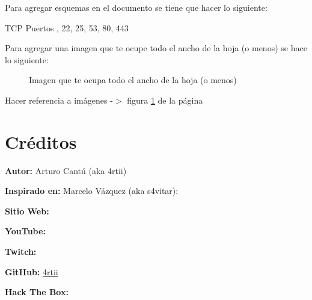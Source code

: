 \documentclass[a4paper]{article} %
\begin{document}
    \vspace{0.3cm}
        
    Para agregar esquemas en el documento se tiene que hacer lo siguiente:
        
    \begin{schema}{TCP}
        Puertos
        , 22, 25, 53, 80, 443
    \end{schema}
        
    \vspace{0.3cm}
        
    Para agregar una imagen que te ocupe todo el ancho de la hoja (o menos) se hace lo siguiente:
    \begin{figure}[h]
        \centering
        \caption{Imagen que te ocupa todo el ancho de la hoja (o menos)}
        \label{fig:test}
    \end{figure}
        
    \vspace{0.3cm}
        
    Hacer referencia a imágenes -$>$ figura \ref{fig:test} de la página \pageref{fig:test}
        
    \clearpage
    
    
    \section{Créditos}
        \textbf{Autor:} Arturo Cantú (aka 4rtii)
        
        \textbf{Inspirado en:} Marcelo Vázquez (aka s4vitar): \href{https://youtube.com/watch?v=riNRHoEOBeU}{\color{blue}{Cómo crear un reporte profesional en LaTeX}}
        
        \textbf{Sitio Web:} \href{https://4rtii.github.io}{\color{blue}{4rtii.github.io}}
        
        \textbf{YouTube:} \href{https://youtube.com/c/4rtii}{\color{blue}{4rtii}}
        
        \textbf{Twitch:} \href{https://twitch.tv/4rtii_}{\color{blue}{4rtii_}}
        
        \textbf{GitHub:} \href{https://github.com/4rtii}{\color{blue}4rtii}
        
        \textbf{Hack The Box:} \href{https://app.hackthebox.com/profile/839583}{\color{blue}{4rtii}}
        
\end{document}
